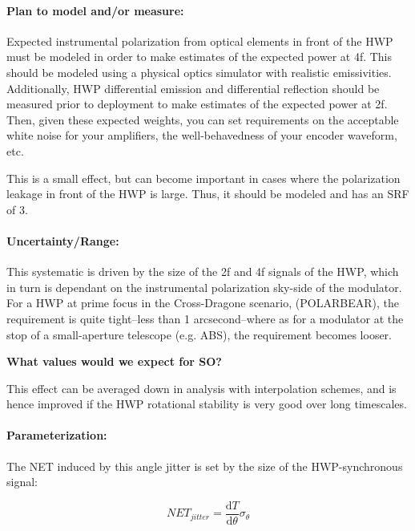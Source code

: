 \paragraph{Plan to model and/or measure:}

Expected instrumental polarization from optical elements in front of the HWP must be modeled in order to make estimates of the expected power at 4f. This should be modeled using a physical optics simulator with realistic emissivities. Additionally, HWP differential emission and differential reflection should be measured prior to deployment to make estimates of the expected power at 2f. Then, given these expected weights, you can set requirements on the acceptable white noise for your amplifiers, the well-behavedness of your encoder waveform, etc.

This is a small effect, but can become important in cases where the polarization leakage in front of the HWP is large. Thus, it should be modeled and has an SRF of 3.

\paragraph{Uncertainty/Range:}

This systematic is driven by the size of the 2f and 4f signals of the HWP, which in turn is dependant on the instrumental polarization sky-side of the modulator. For a HWP at prime focus in the Cross-Dragone scenario, (POLARBEAR), the requirement is quite tight--less than 1 arcsecond--where as for a modulator at the stop of a small-aperture telescope (e.g. ABS), the requirement becomes looser.

\textbf{What values would we expect for SO?}

This effect can be averaged down in analysis with interpolation schemes, and is hence improved if the HWP rotational stability is very good over long timescales.

\paragraph{Parameterization:}

The NET induced by this angle jitter is set by the size of the HWP-synchronous signal:
 
 \begin{equation}
 	NET_{jitter} = \frac{\mathrm{d}T}{\mathrm{d}\theta} \sigma_{\theta} 
 \end{equation}

